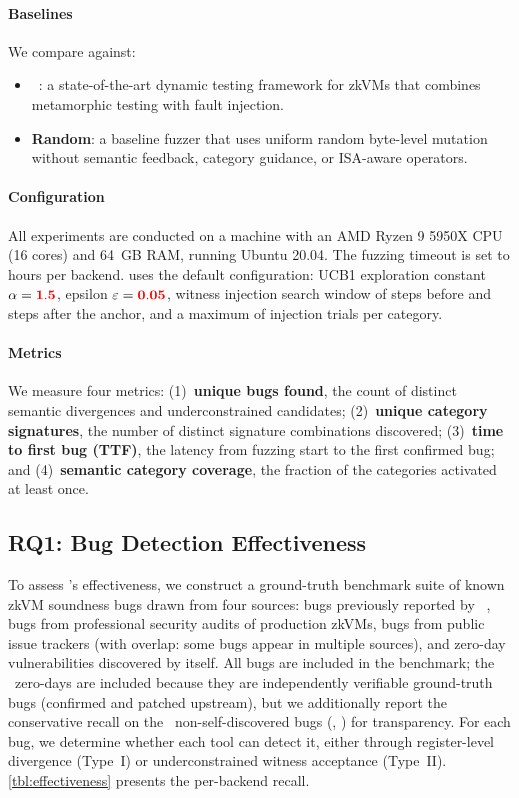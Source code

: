\paragraph{Baselines}
We compare \tool against:
\begin{itemize}
    \item \textbf{\arguzz}~\cite{arguzz}: a state-of-the-art dynamic testing framework for zkVMs that combines metamorphic testing with fault injection.
    \item \textbf{Random}: a baseline fuzzer that uses uniform random byte-level mutation without semantic feedback, category guidance, or ISA-aware operators.
\end{itemize}

\paragraph{Configuration}
All experiments are conducted on a machine with an AMD Ryzen 9 5950X CPU (16 cores) and 64~GB RAM, running Ubuntu 20.04. The fuzzing timeout is set to  hours per backend. \tool uses the default configuration: UCB1 exploration constant $\alpha = {{\color{red}{{{\bf 1.5}}}}}$, epsilon $\varepsilon = {{\color{red}{{{\bf 0.05}}}}}$, witness injection search window of  steps before and  steps after the anchor, and a maximum of  injection trials per category.

\paragraph{Metrics}
We measure four metrics: (1)~\textbf{unique bugs found}, the count of distinct semantic divergences and underconstrained candidates; (2)~\textbf{unique category signatures}, the number of distinct signature combinations discovered; (3)~\textbf{time to first bug (TTF)}, the latency from fuzzing start to the first confirmed bug; and (4)~\textbf{semantic category coverage}, the fraction of the  categories activated at least once.

\subsection{RQ1: Bug Detection Effectiveness}\label{sec:eval-rq1}

To assess \tool's effectiveness, we construct a ground-truth benchmark suite of  known zkVM soundness bugs drawn from four sources:  bugs previously reported by \arguzz~\cite{arguzz},  bugs from professional security audits of production zkVMs,  bugs from public issue trackers (with overlap: some bugs appear in multiple sources), and  zero-day vulnerabilities discovered by \tool itself. All  bugs are included in the benchmark; the ~zero-days are included because they are independently verifiable ground-truth bugs (confirmed and patched upstream), but we additionally report the conservative recall on the ~non-self-discovered bugs (, ) for transparency. For each bug, we determine whether each tool can detect it, either through register-level divergence (Type~I) or underconstrained witness acceptance (Type~II). \autoref{tbl:effectiveness} presents the per-backend recall.

